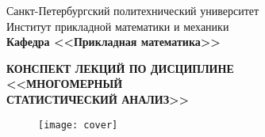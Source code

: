 \documentclass[main.tex]{subfiles}
\begin{document}
\begin{titlepage}
\begin{center}
	\begin{large}
		Санкт-Петербургский политехнический университет\\
		Институт прикладной математики и механики\\
		\textbf{Кафедра <<Прикладная математика>>}\\
	\end{large}
	\vfill
	\Large{\textbf{КОНСПЕКТ ЛЕКЦИЙ ПО ДИСЦИПЛИНЕ \\
			 <<МНОГОМЕРНЫЙ \\
			 СТАТИСТИЧЕСКИЙ АНАЛИЗ>>}}
\end{center}
\vfill
\begin{figure}[H]
	\centering \texttt{[image: cover]}
\end{figure}
\vfill
{}
\end{titlepage}
\end{document}
